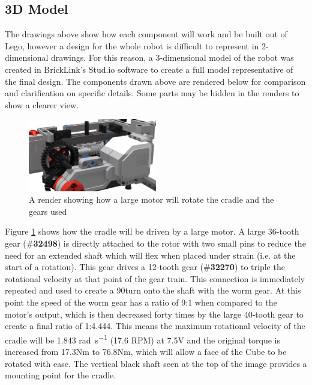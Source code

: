 \documentclass{report}
\newcommand{\tbo}[1]{\textbf{#1}}
\newcommand{\legopiece}[1]{(\#\tbo{#1})}
\begin{document}
	\subsection{3D Model}
	
	The drawings above show how each component will work and be built out of Lego, however a design for the whole robot is difficult to represent in 2-dimensional drawings. For this reason, a 3-dimensional model of the robot was created in BrickLink's Stud.io software \cite{BrickLink} to create a full model representative of the final design. The components drawn above are rendered below for comparison and clarification on specific details. Some parts may be hidden in the renders to show a clearer view.
	
	\begin{figure}[H]
		\begin{center}
			\includegraphics[width=0.5\textwidth]{Resources/Images/rdrWormGear.png}
			\caption{A render showing how a large motor will rotate the cradle and the gears used}
			\label{fig:rdrWormGear}
		\end{center}
	\end{figure}

	Figure \ref{fig:rdrWormGear} shows how the cradle will be driven by a large motor. A large 36-tooth gear \legopiece{32498} is directly attached to the rotor with two small pins to reduce the need for an extended shaft which will flex when placed under strain (i.e. at the start of a rotation). This gear drives a 12-tooth gear \legopiece{32270} to triple the rotational velocity at that point of the gear train. This connection is immediately repeated and used to create a 90\degree turn onto the shaft with the worm gear. At this point the speed of the worm gear has a ratio of 9:1 when compared to the motor's output, which is then decreased forty times by the large 40-tooth gear to create a final ratio of 1:4.444. This means the maximum rotational velocity of the cradle will be 1.843 \si{\radian\per\second} (17.6 RPM) at 7.5V and the original torque is increased from 17.3Nm to 76.8Nm, which will allow a face of the Cube to be rotated with ease. The vertical black shaft seen at the top of the image provides a mounting point for the cradle.
	
\end{document}
